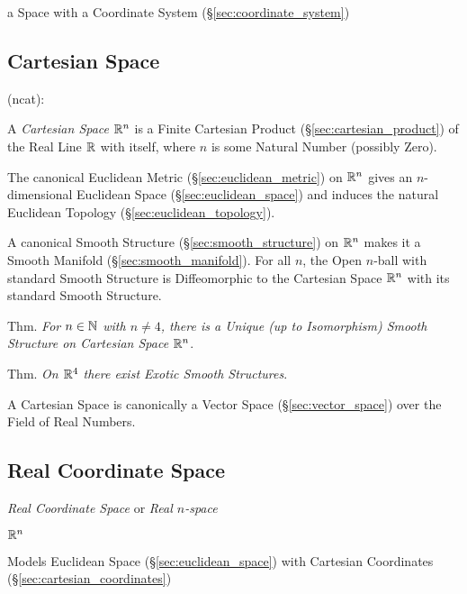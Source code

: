 a Space with a Coordinate System (\S\ref{sec:coordinate_system})



\subsection{Cartesian Space}\label{sec:cartesian_space}

(ncat):

A \emph{Cartesian Space} $\mathbb{R}^n$ is a Finite Cartesian Product
(\S\ref{sec:cartesian_product}) of the Real Line $\mathbb{R}$ with itself, where
$n$ is some Natural Number (possibly Zero).

The canonical Euclidean Metric (\S\ref{sec:euclidean_metric}) on $\mathbb{R}^n$
gives an $n$-dimensional Euclidean Space (\S\ref{sec:euclidean_space}) and
induces the natural Euclidean Topology (\S\ref{sec:euclidean_topology}).

A canonical Smooth Structure (\S\ref{sec:smooth_structure}) on $\mathbb{R}^n$ makes
it a Smooth Manifold (\S\ref{sec:smooth_manifold}). For all $n$, the Open
$n$-ball with standard Smooth Structure is Diffeomorphic to the Cartesian Space
$\mathbb{R}^n$ with its standard Smooth Structure.

Thm. \emph{For $n \in \mathbb{N}$ with $n \neq 4$, there is a Unique (up to
  Isomorphism) Smooth Structure on Cartesian Space $\mathbb{R}^n$}.

Thm. \emph{On $\mathbb{R}^4$ there exist Exotic Smooth Structures}.

A Cartesian Space is canonically a Vector Space (\S\ref{sec:vector_space}) over
the Field of Real Numbers.



\subsection{Real Coordinate Space}\label{sec:real_coordinate_space}

\emph{Real Coordinate Space} or \emph{Real $n$-space}

$\mathbb{R}^n$

Models Euclidean Space (\S\ref{sec:euclidean_space}) with Cartesian
Coordinates (\S\ref{sec:cartesian_coordinates})

